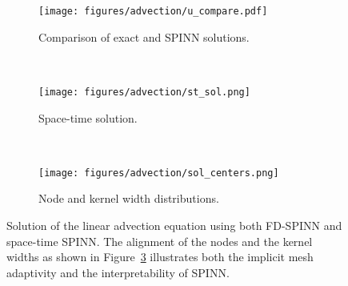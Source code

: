 \documentclass[12pt]{article}
\begin{document}
\begin{figure}
\begin{subfigure}{0.32\textwidth}
\texttt{[image: figures/advection/u\_compare.pdf]}
\caption{Comparison of exact and SPINN solutions.}
\label{fig:advection_comp}
\end{subfigure}
~
\begin{subfigure}{0.32\textwidth}
\texttt{[image: figures/advection/st\_sol.png]}
\caption{Space-time solution.}
\label{fig:advection_st}
\end{subfigure}
~
\begin{subfigure}{0.32\textwidth}
\texttt{[image: figures/advection/sol\_centers.png]}
\caption{Node and kernel width distributions.}
\label{fig:advection_nodes}
\end{subfigure}
\caption{Solution of the linear advection equation using both FD-SPINN and space-time SPINN. The alignment of the nodes and the kernel widths as shown in Figure~\ref{fig:advection_nodes} illustrates both the implicit mesh adaptivity and the interpretability of SPINN.}
\label{fig:linear_advection}
\end{figure}
\end{document}
